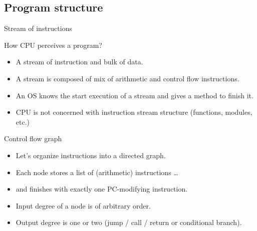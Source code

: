 \documentclass[8pt]{beamer}
\begin{document}
\subsection{Program structure}

\begin{frame}{Stream of instructions}
  \begin{block}{How CPU perceives a program?}
    \begin{itemize}
      \item A stream of instruction and bulk of data.
      \item A stream is composed of mix of arithmetic and control flow instructions.
      \item An OS knows the start execution of a stream and gives a method to
        finish it.
      \item CPU is not concerned with instruction stream structure (functions,
        modules, etc.)
    \end{itemize}
  \end{block}

  \begin{block}{Control flow graph}
    \begin{itemize}
      \item Let's organize instructions into a directed graph.
      \item Each node stores a list of (arithmetic) instructions \ldots
      \item and finishes with exactly one PC-modifying instruction.
      \item Input degree of a node is of arbitrary order.
      \item Output degree is one or two (jump / call / return or conditional branch).
    \end{itemize}
  \end{block}
\end{frame}
\end{document}
